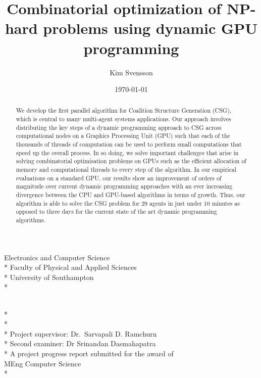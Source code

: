\documentclass[a4paper, 12pt]{report}
\newcommand{\tdegree}{A project progress report submitted for the award of\\}
\newcommand{\degree}{\tdegree MEng Computer Science\\*}
\newcommand{\texam}{Second examiner: }
\newcommand{\exam}{\texam Dr Srinandan Dasmahapatra}
\newcommand{\tsupervisor}{Project supervisor: }
\newcommand{\supervisor}{\tsupervisor Dr.\ Sarvapali D. Ramchurn}
\newcommand{\school}{Electronics and Computer Science \\*
Faculty of Physical and Applied Sciences\\*
University of Southampton\\*}
\newenvironment{changemargin}[2]{%
\begin{list}{}{%
\setlength{\topsep}{0pt}%
\setlength{\leftmargin}{#1}%
\setlength{\rightmargin}{#2}%
\setlength{\listparindent}{\parindent}%
\setlength{\itemindent}{\parindent}%
\setlength{\parsep}{\parskip}%
}%
\item[]}{\end{list}}
\begin{document}
\author{Kim Svensson}
\date{\today}
\title{Combinatorial optimization of NP-hard problems using dynamic GPU
programming}

\makeatletter
\begin{titlepage}
\begin{changemargin}{-2cm}{-2cm}
\begin{center}
\LARGE\school %

\LARGE
\vfill
\@author \\*
\@date \\*
\doublespacing
\@title \\*
\vfill
\singlespacing
\supervisor \\*
\exam \\*
\vfill
\degree
\end{center} 
\end{changemargin}
\end{titlepage}
\makeatother

\begin{abstract}
We develop the first parallel algorithm for Coalition Structure Generation
(CSG), which is central to many multi-agent systems applications. Our approach
involves distributing the key steps of a dynamic programming approach to CSG
across computational nodes on a Graphics Processing Unit (GPU) such that each of
the thousands of threads of computation can be used to perform small
computations that speed up the overall process. In so doing, we solve important
challenges that arise in solving combinatorial optimisation problems on GPUs
such as the efficient allocation of memory and computational threads to every
step of the algorithm. In our empirical evaluations on a standard GPU,  our
results show an improvement of orders of magnitude over current dynamic
programming approaches with an ever increasing divergence between the CPU and
GPU-based algorithms in terms of growth. Thus, our algorithm is able to solve
the CSG problem for 29 agents in just under 10 minutes as opposed to three
days for the current state of the art dynamic programming algorithms.

\end{abstract}
\tableofcontents
\newpage
\end{document}
